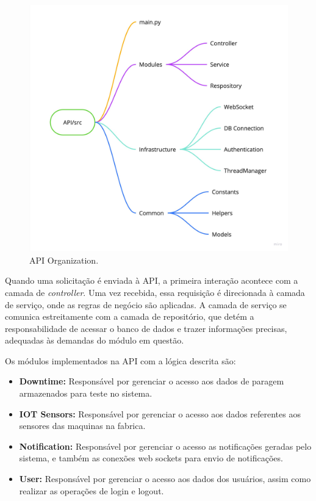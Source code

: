 \begin{figure}[htbp]
	\centering
	\includegraphics[width=\textwidth]{images/API_Organization.jpg}
	\caption{API Organization.}
	\label{fig:api_organization}
\end{figure}

Quando uma solicitação é enviada à \gls{API}, a primeira interação acontece com a camada de \textit{controller}. Uma vez recebida, essa requisição é direcionada à camada de serviço, onde as regras de negócio são aplicadas. A camada de serviço se comunica estreitamente com a camada de repositório, que detém a responsabilidade de acessar o banco de dados e trazer informações precisas, adequadas às demandas do módulo em questão.

Os módulos implementados na \gls{API} com a lógica descrita são:
\begin{itemize}
	\item \textbf{Downtime:} Responsável por gerenciar o acesso aos dados de paragem armazenados para teste no sistema.
	\item \textbf{IOT Sensors:} Responsável por gerenciar o acesso aos dados referentes aos sensores das maquinas na fabrica.
	\item \textbf{Notification:} Responsável por gerenciar o acesso as notificações geradas pelo sistema, e também as conexões web sockets para envio de notificações.
	\item \textbf{User:} Responsável por gerenciar o acesso aos dados dos usuários, assim como realizar as operações de login e logout. 
\end{itemize}

